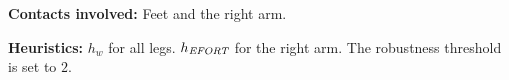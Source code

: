 \documentclass[journal]{IEEEtran}
\providecommand{\DIFdeltex}[1]{} %
\providecommand{\DIFdelbegin}{\protect\cbdelete} %
\providecommand{\DIFdelend}{} %
\providecommand{\DIFdel}[1]{\texorpdfstring{\DIFdeltex{#1}}{}} %
\begin{document}
\noindent\textbf{Contacts involved:} Feet and the right arm.

\noindent\textbf{Heuristics:} $h_w$  for all legs. $h_{\textrm{\it EFORT}}$  for the right arm. The robustness threshold is set to $2$.



\end{document}
